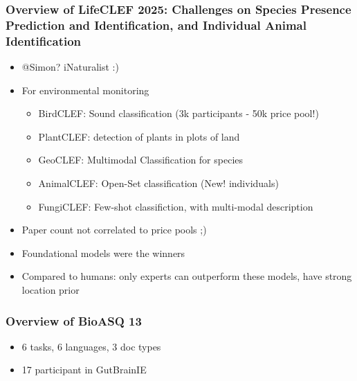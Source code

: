 \documentclass[a4paper]{article}
\begin{document}
\subsubsection{Overview of LifeCLEF 2025: Challenges on Species Presence Prediction and Identification, and Individual Animal Identification}
\begin{itemize}
    \item @Simon? iNaturalist :)
    \item For environmental monitoring
          \begin{itemize}
              \item BirdCLEF: Sound classification (3k participants - 50k price pool!)
              \item PlantCLEF: detection of plants in plots of land
              \item GeoCLEF: Multimodal Classification for species
              \item AnimalCLEF: Open-Set classification (New! individuals)
              \item FungiCLEF: Few-shot classifiction, with multi-modal description
          \end{itemize}
    \item Paper count not correlated to price pools ;)
    \item Foundational models were the winners
    \item Compared to humans: only experts can outperform these models, have strong location prior
\end{itemize}
\subsubsection{Overview of BioASQ 13}
\begin{itemize}
    \item 6 tasks, 6 languages, 3 doc types
    \item 17 participant in GutBrainIE
\end{itemize}
\end{document}
